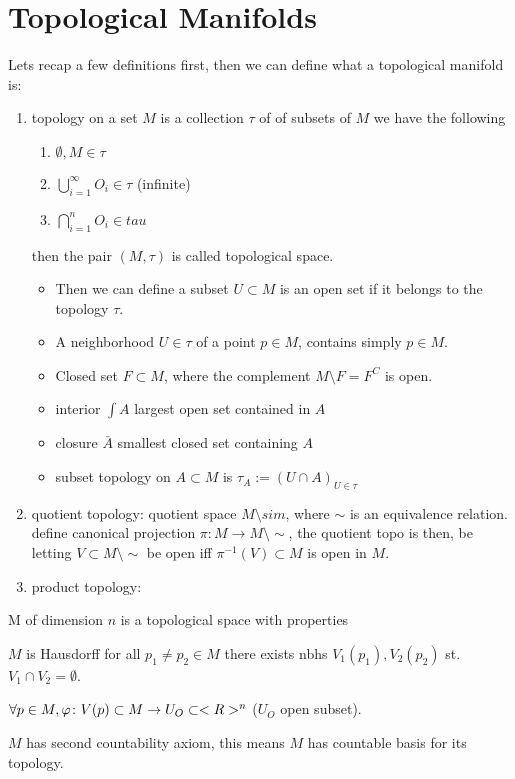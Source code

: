 \section{Topological Manifolds}
Lets recap a few definitions first, then we can define what a topological manifold is:
\begin{erinnerung}
	\begin{enumerate}
		\item topology on a set $M$ is a collection $\tau$ of  of subsets of $M$ we have the following
		\begin{enumerate}
			\item $\emptyset, M \in \tau$
			\item $\bigcup_{i=1}^{\infty} O_i \in \tau$ (infinite)
			\item $\bigcap_{i=1}^n O_i \in tau$
		\end{enumerate}
		then the pair $(M,\tau)$ is called topological space.
		\begin{itemize}
			\item Then we can define a subset $U \subset M$ is an open set if it belongs to the topology $\tau$.
			\item A neighborhood $U \in \tau$ of a point $p \in M$, contains simply $p \in M$.
			\item Closed set $F \subset M$, where the complement $M \setminus F = F^C$ is open.
			\item interior $\int A$ largest open set contained in $A$
			\item closure $\bar{A}$ smallest closed set containing $A$
			\item subset topology on $A\subset M$ is $\tau_A := (U \cap A)_{U \in \tau}$
		\end{itemize}
	\item quotient topology: quotient space $M\setminus sim$, where $\sim$ is an equivalence relation.
	define canonical projection $\pi\colon M \to M\setminus \sim$, the quotient topo is then, be letting $V \subset M\setminus \sim$ be open iff $\pi^{-1}(V) \subset M$ is open in $M$.
	\item product topology: 
	\end{enumerate}
\end{erinnerung}
\begin{definition}
	M of dimension $n$ is a topological space with properties
	\begin{defenum}
		\item $M$ is Hausdorff for all $p_1\neq p_2 \in M$ there exists nbhs $V_1(p_1), V_2(p_2)$ st. $V_1 \cap V_2 = \emptyset$.\label{chap1_1:def:topomf:haus}
		\item $\forall p \in M,\varphi\colon V(p) \subset M \to U_O \subset <R>^n$ ($U_O$ open subset).\label{chap1_2:def:topomf:nbh}
		\item $M$ has second countability axiom, this means $M$ has countable basis for its topology.\label{chap1_2:def:topomf:basis}
	\end{defenum}
\end{definition}
